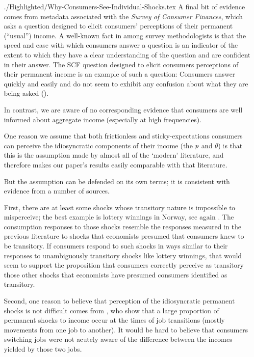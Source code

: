 \documentclass[titlepage]{./econtex}
\begin{document}
\begin{verbatimwrite}{./Highlighted/Why-Consumers-See-Individual-Shocks.tex}
A final bit of evidence comes from metadata associated with the \textit{Survey of Consumer Finances}, which asks a question designed to elicit consumers' perceptions of their permanent (``usual'') income.  A well-known fact in among survey methodologists is that the speed and ease with which consumers answer a question is an indicator of the extent to which they have a clear understanding of the question and are confident in their answer.  The SCF question designed to elicit consumers perceptions of their permanent income is an example of such a question: Consumers answer quickly and easily and do not seem to exhibit any confusion about what they are being asked (\cite{kennickellPermanent}).

In contrast, we are aware of no corresponding evidence that consumers are well informed about aggregate income (especially at high frequencies).\end{verbatimwrite}%

One reason we assume that both frictionless and sticky-expectations consumers can perceive the idiosyncratic components of their income (the $p$ and $\theta$) is that this is the assumption made by almost all of the `modern' literature, and therefore makes our paper's results easily comparable with that literature.

But the assumption can be defended on its own terms; it is consistent with evidence from a number of sources.

First, there are at least some shocks whose transitory nature is impossible to misperceive; the best example is lottery winnings in Norway, see again \cite{fhnMPC}.  The consumption responses to those shocks resemble the responses measured in the previous literature to shocks that economists presumed that consumers knew to be transitory.  If consumers respond to such shocks in ways similar to their responses to unambiguously transitory shocks like lottery winnings, that would seem to support the proposition that consumers correctly perceive as transitory those other shocks that economists have presumed consumers identified as transitory.

Second, one reason to believe that perception of the idiosyncratic permanent shocks is not difficult comes from \cite{lmpPermShocks}, who show that a large proportion of permanent shocks to income occur at the times of job transitions (mostly movements from one job to another).  It would be hard to believe that consumers switching jobs were not acutely aware of the difference between the incomes yielded by those two jobs.
\end{document}
